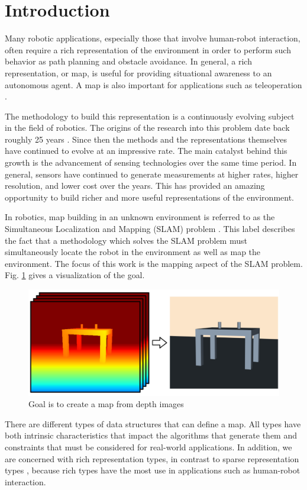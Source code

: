 
\section{Introduction} \label{sec:introduction}

Many robotic applications, especially those that involve human-robot
interaction, often require a rich representation of the environment in order to
perform such behavior as path planning and obstacle avoidance. In general, a
rich representation, or map, is useful for providing situational awareness to an
autonomous agent. A map is also important for applications such as teleoperation
\cite{Kadous2006}.

The methodology to build this representation is a continuously evolving subject
in the field of robotics. The origins of the research into this problem date
back roughly 25 years \cite{Lorensen1987}. Since then the methods and the
representations themselves have continued to evolve at an impressive rate. The
main catalyst behind this growth is the advancement of sensing technologies over
the same time period. In general, sensors have continued to generate
measurements at higher rates, higher resolution, and lower cost over the years.
This has provided an amazing opportunity to build richer and more useful
representations of the environment.

In robotics, map building in an unknown environment is referred to as the
Simultaneous Localization and Mapping (SLAM) problem \cite{Thrun2002}. This
label describes the fact that a methodology which solves the SLAM problem must
simultaneously locate the robot in the environment as well as map the
environment. The focus of this work is the mapping aspect of the SLAM problem.
Fig. \ref{fig:goal} gives a visualization of the goal.

\begin{figure}[h]%
\centering
\includegraphics[width=.5\textwidth]{figures/diagram_goal.png}
\caption{Goal is to create a map from depth images}
\label{fig:goal}
\end{figure}

There are different types of data structures that can define a map. All types have both
intrinsic characteristics that impact the algorithms that generate them and
constraints that must be considered for real-world applications. In
addition, we are concerned with rich representation types, in contrast to sparse
representation types \cite{Dissanayake2001}, because rich types have the most
use in applications such as human-robot interaction.

